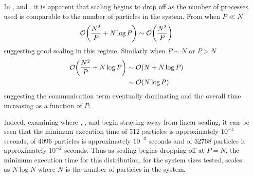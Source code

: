 \begin{figure}[!h]
    
    \caption{}
    \label{fig:v0_replicated_pair_operation_4096_logtime}
\end  {figure}

\begin{figure}[!h]
    
    \caption{}
    \label{fig:v0_replicated_pair_operation_32768_logtime}
\end  {figure}

\vZeroTimeExplanation
    {}
    {}
    {}
    {\pairoperation{}}
    {\replicateddata{}}

In ,
 and
,
it is apparent that scaling begins to drop off as the number
of processes used is comparable to the number of particles in the system.
%
From  when $P \ll{} N$
\begin{equation}
    \mathcal{O}{\left({ \frac{N^2}{P} + N\log{P} }\right)} \sim{} \mathcal{O}{\left({ \frac{N^2}{P} }\right)}
\end  {equation}
suggesting good scaling in this regime.
%
Similarly when $P \sim{} N$
or $P > N$
\begin{align}
    \mathcal{O}{\left({ \frac{N^2}{P} + N\log{P} }\right)}
        &\sim{} \mathcal{O}{\left({ N + N\log{P} }\right)} \\
        &\sim{} \mathcal{O}{\left({ N\log{P} }\right)}
\end  {align}
%
suggesting the communication term eventually dominating and
the overall time increasing as a function of $P$.

Indeed, examining where
,
,
 and
begin straying away from linear scaling,
it can be seen that the minimum execution time
of 512 particles is approximately $10^{-4}$ seconds,
of 4096 particles is approximately $10^{-3}$ seconds and
of 32768 particles is approximately $10^{-2}$ seconds.
%
Thus as scaling begins dropping off at $P = N$,
the minimum execution time for this distribution,
for the system sizes tested,
scales as $N\log{N}$
where $N$ is the number of particles in the system.

